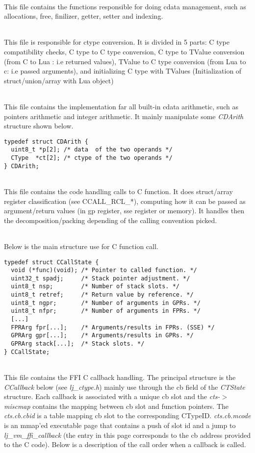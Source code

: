 \\
This file contains the functions responsible for doing cdata management, such as
allocations, free, finilizer, getter, setter and indexing.

\\
This file is responsible for ctype conversion. It is divided in 5 parts: C type
compatibility checks, C type to C type conversion, C type to TValue conversion
(from C to Lua : i.e returned values), TValue to C type conversion (from Lua to
c: i.e passed arguments), and initializing C type with TValues (Initialization
of struct/union/array with Lua object)

\\%
This file contains the implementation far all built-in cdata arithmetic, such
as pointers arithmetic and integer arithmetic. It mainly manipulate some
\emph{CDArith} structure shown below.
\begin{lstlisting}[style=CStyle]
typedef struct CDArith {
  uint8_t *p[2]; /* data  of the two operands */
  CType  *ct[2]; /* ctype of the two operands */
} CDArith;
\end{lstlisting}

\\
This file contains the code handling calls to C function. It does struct/array
register classification (see CCALL\_RCL\_*), computing how it can be passed
as argument/return values (in gp register, sse register or memory). It handles
then the decomposition/packing depending of the calling convention picked.

\\
Below is the main structure use for C function call.
\begin{lstlisting}[style=CStyle]
typedef struct CCallState {
  void (*func)(void); /* Pointer to called function. */
  uint32_t spadj;     /* Stack pointer adjustment. */
  uint8_t nsp;        /* Number of stack slots. */
  uint8_t retref;     /* Return value by reference. */
  uint8_t ngpr;       /* Number of arguments in GPRs. */
  uint8_t nfpr;       /* Number of arguments in FPRs. */
  [...]
  FPRArg fpr[...];    /* Arguments/results in FPRs. (SSE) */
  GPRArg gpr[...];    /* Arguments/results in GPRs. */
  GPRArg stack[...];  /* Stack slots. */
} CCallState;
\end{lstlisting}

\\
This file contains the FFI C callback handling. The principal structure is the
\emph{CCallback} below (see \emph{lj\_ctype.h}) mainly use through the cb field
of the \emph{CTState}
structure. Each callback is associated with a unique cb slot and the
\emph{cts-$>$miscmap} contains the mapping between cb slot and function
pointers. The \emph{cts.cb.cbid} is a table mapping cb slot to the corresponding
CTypeID. \emph{cts.cb.mcode} is an mmap'ed executable page that contains a push
of slot id and a jump to \emph{lj\_vm\_ffi\_callback} (the entry in this page
corresponds to the cb address provided to the C code). Below is a description
of the call order when a callback is called.

